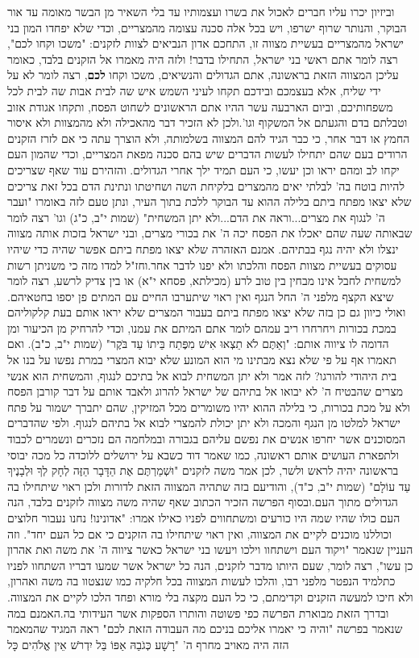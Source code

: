 \documentclass[12pt, openany]{book}
\begin{document}
וביזיון יכרו עליו חברים לאכול את בשרו ועצמותיו עד בלי השאיר מן הבשר מאומה עד אור הבוקר, והנותר שרוף ישרפו, ויש בכל אלה סכנה עצומה מהמצריים, וכדי שלא יפחדו המון בני ישראל מהמצריים בעשיית מצווה זו, התחכם אדון הנביאים לצוות לזקנים: "משכו וקחו לכם", רצה לומר אתם ראשי בני ישראל, התחילו בדבר! ולזה היה מאמרו אל הזקנים בלבד, כאומר עליכן המצווה הזאת בראשונה, אתם הגדולים והנשיאים, משכו וקחו \textrm{\textbf{לכם}}, רצה לומר לא על ידי שליח, אלא בעצמכם ובידכם תקחו לעיני השמש איש שה לבית אבות שה לבית לכל משפחותיכם, וביום הארבעה עשר ההיו אתם הראשונים לשחוט הפסח, ותקחו אגודת אזוב וטבלתם בדם והגעתם אל המשקוף וגו'.ולכן לא הזכיר דבר מהאכילה ולא מהמצוות ולא איסור החמץ או דבר אחר, כי כבר הגיד להם המצווה בשלמותה, ולא הוצרך עתה כי אם לזרז הזקנים הרודים בעם שהם יתחילו לעשות הדברים שיש בהם סכנה מפאת המצריים, וכדי שהמון העם יקחו לב ומהם יראו וכן יעשו, כי העם תמיד ילך אחרי הגדולים. והזהירם עוד שאף שצריכים להיות בוטח בה' לבלתי יאים מהמצרים בלקיחת השה ושחיטתו ונתינת הדם בכל זאת צריכים שלא יצאו מפתח ביתם בלילה ההוא עד הבוקר ללכת בתוך העיר, ונתן טעם לזה באומרו "ועבר ה' לנגוף את מצרים...וראה את הדם...ולא יתן המשחית" (שמות י"ב, כ"ג) וגו' רצה לומר שבאותה שעה שהם יאכלו את הפסח יכה ה' את בכורי מצרים, ובני ישראל בזכות אותה מצווה ינצלו ולא יהיה נגף בבתיהם. אמנם האזהרה שלא יצאו מפתח ביתם אפשר שהיה כדי שיהיו עסוקים בעשיית מצוות הפסח והלכתו ולא יפנו לדבר אחר.וחז"ל למדו מזה כי משניתן רשות למשחית לחבל אינו מבחין בין טוב לרע (מכילתא, פסחא י"א)  או בין צדיק לרשע, רצה לומר שיצא הקצף מלפני ה' החל הנגף ואין ראוי שיתערבו החיים עם המתים פן יספו בחטאיהם. ואולי כיוון גם כן בזה שלא יצאו מפתח ביתם בעבור המצרים שלא יראו אותם בעת קלקוליהם במכת בכורות ויחרחרו ריב עמהם לומר אתם המיתם את עמנו, וכדי להרחיק מן הכיעור ומן הדומה לו ציווה אותם: "וְאַתֶּם לֹא תֵצְאוּ אִישׁ מִפֶּתַח בֵּיתוֹ עַד בֹּקֶר" (שמות י"ב, כ"ב). ואם תאמרו אף על פי שלא נצא מבתינו מי הוא המונע שלא יבוא המצרי במרת נפשו על בנו אל בית היהודי להורגו? לזה אמר ולא יתן המשחית לבוא אל בתיכם לנגוף, והמשחית הוא אנשי מצרים שהבטיח ה' לא יבואו אל בתיהם של ישראל להרוג ולאבד אותם על דבר קורבן הפסח ולא על מכת בכורות, כי בלילה ההוא יהיו משומרים מכל המזיקין, שהם יתברך ישמור על פתח ישראל למלטו מן הנגף והמכה ולא יתן יכולת להמצרי לבוא אל בתיהם לנגוף. ולפי שהדברים המסוכנים אשר יחרפו אנשים את נפשם עליהם בגבורה ובמלחמה הם נזכרים ונשמרים לכבוד ולתפארת העושים אותם ראשונה, כמו שאמר דוד כשבא על ירושלים ללוכדה כל מכה יבוסי בראשונה יהיה לראש ולשר, לכן אמר משה לזקנים "וּשְׁמַרְתֶּם אֶת הַדָּבָר הַזֶּה לְחָק לְךָ וּלְבָנֶיךָ עַד עוֹלָם" (שמות י"ב, כ"ד), והודיעם בזה שתהיה המצווה הזאת לדורות ולכן ראוי שיתחילו בה הגדולים מתוך העם.ובסוף הפרשה הזכיר הכתוב שאף שהיה משה מצווה לזקנים בלבד, הנה העם כולו שהיו שמה היו כורעים ומשתחווים לפניו כאילו אמרו: "אדונינו! נחנו נעבור חלוצים וכוללנו מוכנים לקיים את המצווה, ואין ראוי שיתחילו בה הזקנים כי אם כל העם יחד". וזה העניין שנאמר "ויקוד העם וישתחוו וילכו ויעשו בני ישראל כאשר ציווה ה' את משה ואת אהרון כן עשו", רצה לומר, שעם היותו מדבר לזקנים, הנה כל ישראל אשר שמעו דבריו השתחוו לפניו כתלמיד הנפטר מלפני רבו, והלכו לעשות המצווה בכל חלקיה כמו שנצטוו בה משה ואהרון, ולא חיכו למעשה הזקנים וקדימתם, כי כל העם מקצה בלי מורא ופחד הלכו לקיים את המצווה. ובדרך הזאת מבוארת הפרשה כפי פשוטה והותרו הספקות אשר העידותי בה.האמנם במה שנאמר בפרשה "והיה כי יאמרו אליכם בניכם מה העבודה הזאת לכם" ראה המגיד שהמאמר הזה היה מאויב מחרף ה' "רָשָׁע כְּגֹבַהּ אַפּוֹ בַּל יִדְרֹשׁ אֵין אֱלֹהִים כָּל 
\end{document}
